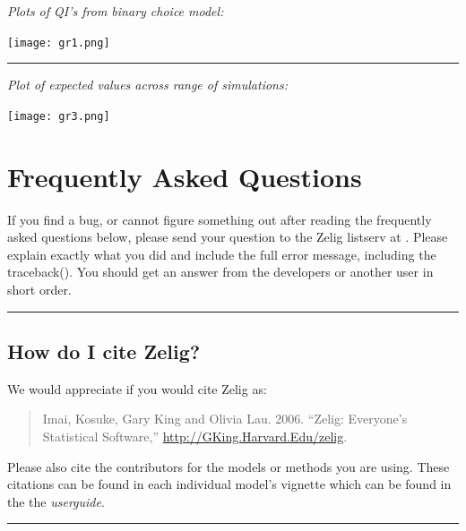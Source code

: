 \documentclass[letterpaper,10pt,english]{sphinxmanual}
\begin{document}
\emph{Plots of QI's from binary choice model:}

\texttt{[image: gr1.png]}


\bigskip\hrule{}\bigskip


\emph{Plot of expected values across range of simulations:}

\texttt{[image: gr3.png]}


\chapter{Frequently Asked Questions}
\label{faq:faq}\label{faq::doc}\label{faq:frequently-asked-questions}
If you find a bug, or cannot figure something out after reading the frequently asked questions below, please send your question to the Zelig listserv at . Please explain exactly what you did and include the full error message, including the traceback(). You should get an answer from the developers or another user in short order.


\bigskip\hrule{}\bigskip



\section{How do I cite Zelig?}
\label{faq:how-do-i-cite-zelig}
We would appreciate if you would cite Zelig as:
\begin{quote}

Imai, Kosuke, Gary King and Olivia Lau. 2006. “Zelig: Everyone’s Statistical Software,” \href{http://GKing.Harvard.Edu/zelig}{http://GKing.Harvard.Edu/zelig}.
\end{quote}

Please also cite the contributors for the models or methods you are using. These citations can be found in each individual model's vignette which can be found in the the \emph{userguide}.


\bigskip\hrule{}\bigskip
\end{document}
